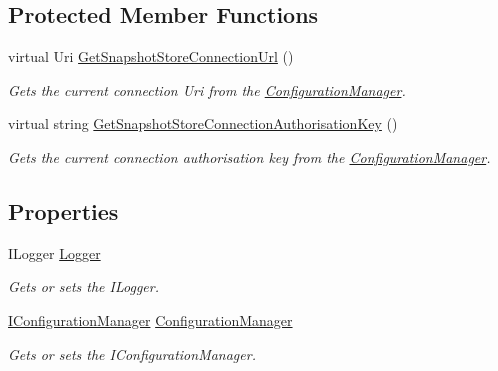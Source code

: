 \subsection*{Protected Member Functions}
\begin{DoxyCompactItemize}
\item 
virtual Uri \hyperlink{classCqrs_1_1Azure_1_1DocumentDb_1_1Events_1_1AzureDocumentDbSnapshotStoreConnectionStringFactory_a024f98c6d21a39c190a6af7da942b3c1_a024f98c6d21a39c190a6af7da942b3c1}{Get\+Snapshot\+Store\+Connection\+Url} ()
\begin{DoxyCompactList}\small\item\em Gets the current connection Uri from the \hyperlink{namespaceCqrs_1_1Azure_1_1ConfigurationManager}{Configuration\+Manager}. \end{DoxyCompactList}\item 
virtual string \hyperlink{classCqrs_1_1Azure_1_1DocumentDb_1_1Events_1_1AzureDocumentDbSnapshotStoreConnectionStringFactory_a6fd3f045a61f38ba6d57c0588e9f734a_a6fd3f045a61f38ba6d57c0588e9f734a}{Get\+Snapshot\+Store\+Connection\+Authorisation\+Key} ()
\begin{DoxyCompactList}\small\item\em Gets the current connection authorisation key from the \hyperlink{namespaceCqrs_1_1Azure_1_1ConfigurationManager}{Configuration\+Manager}. \end{DoxyCompactList}\end{DoxyCompactItemize}
\subsection*{Properties}
\begin{DoxyCompactItemize}
\item 
I\+Logger \hyperlink{classCqrs_1_1Azure_1_1DocumentDb_1_1Events_1_1AzureDocumentDbSnapshotStoreConnectionStringFactory_a61006d4a80f19c13a9e383612dbe978a_a61006d4a80f19c13a9e383612dbe978a}{Logger}
\begin{DoxyCompactList}\small\item\em Gets or sets the I\+Logger. \end{DoxyCompactList}\item 
\hyperlink{interfaceCqrs_1_1Configuration_1_1IConfigurationManager}{I\+Configuration\+Manager} \hyperlink{classCqrs_1_1Azure_1_1DocumentDb_1_1Events_1_1AzureDocumentDbSnapshotStoreConnectionStringFactory_ae68c0462b5619639e4c9f3ac69f0f077_ae68c0462b5619639e4c9f3ac69f0f077}{Configuration\+Manager}
\begin{DoxyCompactList}\small\item\em Gets or sets the I\+Configuration\+Manager. \end{DoxyCompactList}\end{DoxyCompactItemize}


